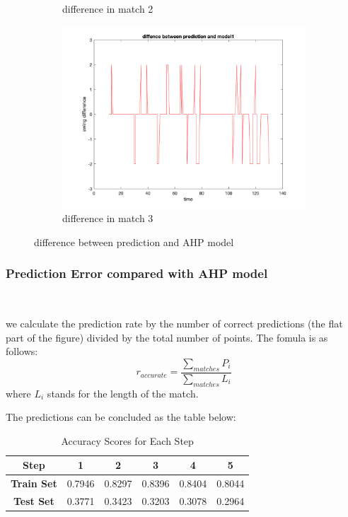\begin{figure}[H]
\begin{subfigure}[b]{0.34\textwidth}
        \caption{difference in match 2}
    \end{subfigure}\hspace{-0.02\textwidth}
    \begin{subfigure}[b]{0.34\textwidth}
        \includegraphics[width=\linewidth]{mainmatter/imgs/swing_diff_match3_overfit.png}
        \caption{difference in match 3}
    \end{subfigure}
    \caption{difference between prediction and AHP model}
    \label{fig:diff swing}
\end{figure}

\subsubsection{Prediction Error compared with AHP model}~{}

we calculate the prediction rate by the number of correct predictions (the flat part of the figure)
divided by the total number of points. The fomula is as follows:
$$ r_{accurate}=\frac{\sum\limits_{matches} P_i}{\sum\limits_{matches} L_i}$$
where $L_i$ stands for the length of the match.

The predictions can be concluded as the table below:

\begin{table}[H]
    \centering
    \begin{tabular}{cccccc}
        \toprule
        \textbf{Step} & \textbf{1} & \textbf{2} & \textbf{3} & \textbf{4} & \textbf{5} \\
        \midrule
        \textbf{Train Set} & 0.7946 & 0.8297 & 0.8396 & 0.8404 & 0.8044 \\
        \textbf{Test Set} & 0.3771 & 0.3423 & 0.3203 & 0.3078 & 0.2964 \\
        \bottomrule
    \end{tabular}
    \caption{Accuracy Scores for Each Step}
    \label{tab:predict_rate_untrained}
\end{table}

